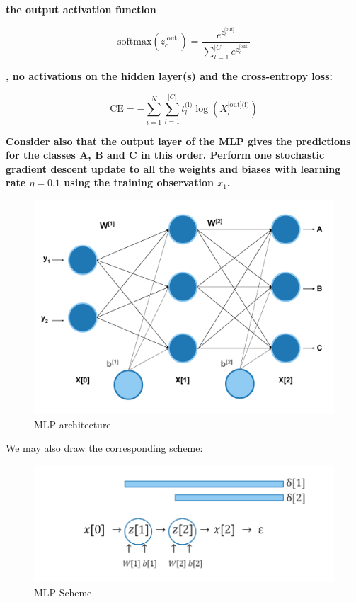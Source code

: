\documentclass[12pt]{article}
\begin{document}
\begin{enumerate}
\textbf{the output activation function}

\begin{equation*}
    \text{softmax}(z_c^\text{[out]}) = \frac{e^{z_c^\text{[out]}}}{\sum_{l=1}^{|C|} e^{z_c^\text{[out]}}}
\end{equation*}

\textbf{, no activations on the hidden layer(s) and the cross-entropy loss:}

\begin{equation}\label{eq:CE}
    \text{CE} = -\sum_{i=1}^{N}\sum_{l=1}^{|C|} t_{l}^{\text{(i)}} \log(X_{l}^{\text{[out](i)}})
\end{equation}

\textbf{Consider also that the output layer of the MLP gives the predictions for the classes A, B and C in this order. Perform one
stochastic gradient descent update to all the weights and biases with learning rate $\eta = 0.1$
using the training observation $x_1$.}

\begin{figure}[H]
    \centering
    \includegraphics[width=12cm]{./Part I/MLP_corrected.pdf}
    \caption{MLP architecture}
\end{figure}

\vspace{10pt}
We may also draw the corresponding scheme:
\begin{figure}[H]
    \centering
    \includegraphics[width=12cm]{./Part I/Scheme.png}
    \caption{MLP Scheme}
\end{figure}


\end{enumerate}
\end{document}
